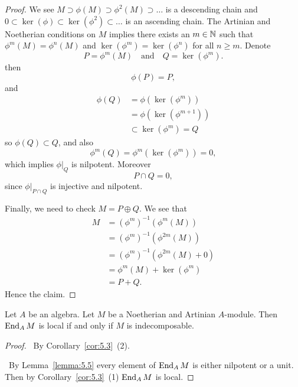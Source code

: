 \begin{proof}
We see
$M\supset\phi(M)\supset\phi^{2}(M)\supset\dots$ is a descending chain
and $0\subset\ker(\phi)\subset\ker(\phi^{2})\subset\dots$ is an
ascending chain. The Artinian and Noetherian conditions on $M$ implies
there exists an $m\in\mathbb{N}$ such that $\phi^{m}(M)=\phi^{n}(M)$ and
$\ker(\phi^{m})=\ker(\phi^{n})$ for all $n\geq m$. Denote
\begin{equation}
P=\phi^{m}(M)\quad\mbox{and}\quad Q=\ker(\phi^{m}).
\end{equation}
then
\begin{equation}
\phi(P)=P,
\end{equation}
and
\begin{subequations}
  \begin{align}
\phi(Q) &=\phi(\ker(\phi^{m}))\\
&=\phi(\ker(\phi^{m+1}))\\
&\subset\ker(\phi^{m})=Q
  \end{align}
\end{subequations}
so $\phi(Q)\subset Q$, and also
\begin{equation}
\phi^{m}(Q)=\phi^{m}(\ker(\phi^{m}))=0,
\end{equation}
which implies $\phi|_{Q}$ is nilpotent. Moreover
\begin{equation}
P\cap Q=0,
\end{equation}
since $\phi|_{P\cap Q}$ is injective and nilpotent.

Finally, we need to check $M=P\oplus Q$. We see that
\begin{subequations}
  \begin{align}
M &= (\phi^{m})^{-1}(\phi^{m}(M))\\
&=(\phi^{m})^{-1}(\phi^{2m}(M))\\
&=(\phi^{m})^{-1}(\phi^{2m}(M)+0)\\
&=\phi^{m}(M)+\ker(\phi^{m})\\
&=P+Q.
  \end{align}
\end{subequations}
Hence the claim.
\end{proof}

\begin{corollary}\label{cor:5.6}
Let $A$ be an algebra. Let $M$ be a Noetherian and Artinian $A$-module.
Then $\operatorname{End}_{A}M$ is local if and only if $M$ is indecomposable.
\end{corollary}

\begin{proof}
\forwardproof\ By Corollary~\ref{cor:5.3}~(2).

\backwardproof\ By Lemma~\ref{lemma:5.5} every element of $\operatorname{End}_{A}M$ is either
nilpotent or a unit. Then by Corollary~\ref{cor:5.3}~(1) $\operatorname{End}_{A}M$
is local.
\end{proof}


